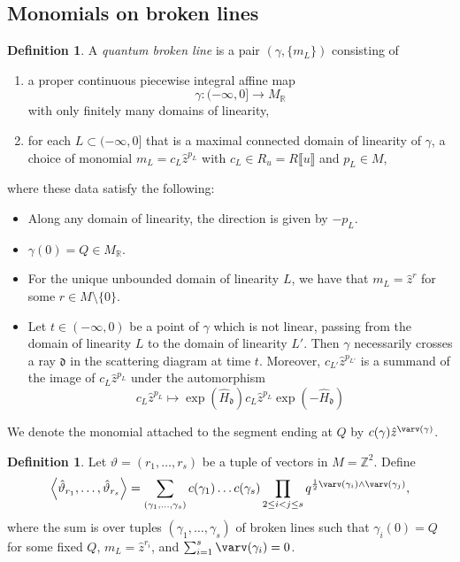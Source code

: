 \documentclass[11pt]{amsart}
\numberwithin{equation}{section}
\theoremstyle{plain}
\theoremstyle{remark}
\theoremstyle{definition}
\newtheorem{definition}[theorem]{Definition}
\newcommand\fd{\mathfrak d}
\newcommand{\RR}{\mathbb{R}}
\newcommand{\ZZ}{\mathbb{Z}}
\begin{document}
\subsection{Monomials on broken lines}\label{sec : broken lines}

\begin{definition}
    A \emph{quantum broken line} is a pair $(\gamma,\{m_L\})$ consisting of  
    \begin{enumerate}
    \item a proper continuous piecewise integral affine map
      $$\gamma \colon (-\infty,0] \longrightarrow M_{\RR}$$ with only finitely many domains of linearity, 
        \item for each $L \subset (-\infty ,0]$ that is a maximal connected domain of linearity of $\gamma$, a choice of monomial $m_{L} = c_L \hat{z}^{p_L}$ with $c_L \in R_{u} = R \llbracket u \rrbracket$ and $p_L \in M$,
    \end{enumerate} 
    where these data satisfy the following:  
\begin{itemize}
    \item Along any domain of linearity, the direction is given by $-p_L$.
    \item $\gamma(0) = Q \in M_{\RR}$.
    \item For the unique unbounded domain of linearity $L$, we have that $m_L = \hat{z}^{r}$ for some $r \in M \setminus \{0\}$. 
    \item Let $t \in (-\infty,0)$ be a point of $\gamma$ which is not linear, passing from the domain of linearity $L$ to the domain of linearity $L'$. Then $\gamma$ necessarily crosses a ray $\fd$ in the scattering diagram at time $t$. Moreover, $c_{L'} \hat{z}^{p_{L'}}$ is a summand of the image of $ c_L \hat{z}^{p_L}$ under the automorphism
      $$c_L \hat{z}^{p_L} \longmapsto \exp\left(\hat{H}_{\fd}\right)c_L \hat{z}^{p_L}\exp\left(-\hat{H}_{\fd}\right)$$ 
\end{itemize}
\end{definition}

We denote the monomial attached to the segment ending at $Q$ by $c(\gamma)\hat{z}^{\varv(\gamma)}$.

\begin{definition}\label{def : quantum broken line count}
Let $\vartheta = (r_1,\dots,r_s)$ be a tuple of vectors in $M=\ZZ^2$. Define 
\begin{equation}\label{quantum broken line count}
\left\langle \hat{\vartheta}_{r_1},\dots, \hat{\vartheta}_{r_s}\right\rangle = \sum_{(\gamma_1,\dots,\gamma_s)} c(\gamma_1) \dots c(\gamma_s) \prod_{2 \leq i < j \leq s} q^{\frac{1}{2}\varv(\gamma_i) \wedge \varv(\gamma_j)}, 
\end{equation}
where the sum is over tuples $(\gamma_1,\dots,\gamma_s)$  of broken lines such that $\gamma_i(0) = Q$ for some fixed $Q$, $m_L = \hat{z}^{r_i}$, and $\sum_{i=1}^{s} \varv(\gamma_i) = 0$.
\end{definition}
\end{document}
